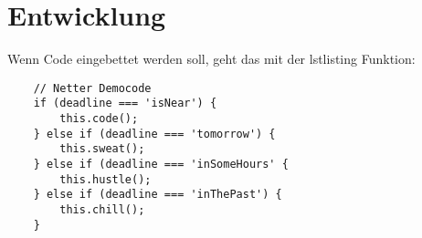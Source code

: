\section{Entwicklung}\label{sec:development}
Wenn Code eingebettet werden soll, geht das mit der lstlisting Funktion:
\begin{lstlisting}
    // Netter Democode
    if (deadline === 'isNear') {
        this.code();
    } else if (deadline === 'tomorrow') {
        this.sweat();
    } else if (deadline === 'inSomeHours' {
        this.hustle();
    } else if (deadline === 'inThePast') {
        this.chill();
    }
\end{lstlisting}